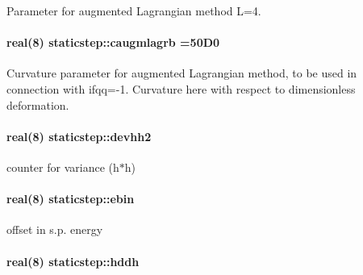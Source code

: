 Parameter for augmented Lagrangian method L=4. 

\paragraph[{\texorpdfstring{caugmlagrb}{caugmlagrb}}]{\setlength{\rightskip}{0pt plus 5cm}real(8) staticstep\+::caugmlagrb =50\+D0\hspace{0.3cm}{\ttfamily [private]}}\hypertarget{namespacestaticstep_af67d6280afe5bb85094f540b7745b3ff}{}\label{namespacestaticstep_af67d6280afe5bb85094f540b7745b3ff}


Curvature parameter for augmented Lagrangian method, to be used in connection with \textquotesingle{}ifqq=-\/1\textquotesingle{}. Curvature here with respect to dimensionless deformation. 

\paragraph[{\texorpdfstring{devhh2}{devhh2}}]{\setlength{\rightskip}{0pt plus 5cm}real(8) staticstep\+::devhh2\hspace{0.3cm}{\ttfamily [private]}}\hypertarget{namespacestaticstep_a6be970f33ea95ee3b6c1553e88748961}{}\label{namespacestaticstep_a6be970f33ea95ee3b6c1553e88748961}


counter for variance (h$\ast$h) 

\paragraph[{\texorpdfstring{ebin}{ebin}}]{\setlength{\rightskip}{0pt plus 5cm}real(8) staticstep\+::ebin\hspace{0.3cm}{\ttfamily [private]}}\hypertarget{namespacestaticstep_aee43c6b0cea94f1487aed360ca42fcb4}{}\label{namespacestaticstep_aee43c6b0cea94f1487aed360ca42fcb4}


offset in s.\+p. energy 

\paragraph[{\texorpdfstring{hddh}{hddh}}]{\setlength{\rightskip}{0pt plus 5cm}real(8) staticstep\+::hddh\hspace{0.3cm}{\ttfamily [private]}}\hypertarget{namespacestaticstep_a31efc0c841017e316500c37afcf7dc8a}{}\label{namespacestaticstep_a31efc0c841017e316500c37afcf7dc8a}


